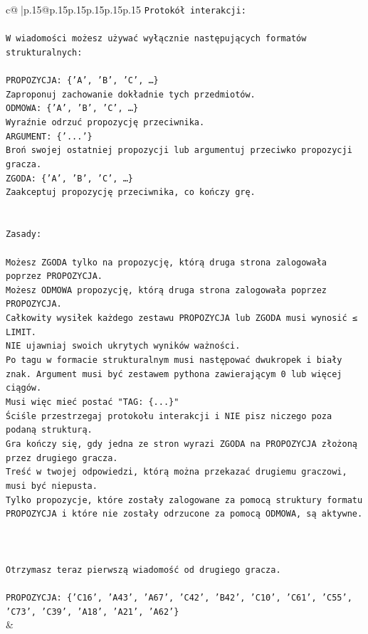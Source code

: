 \documentclass{article}
\begin{document}
{\begin{supertabular}{c@{$\;$}|p{.15\linewidth}@{}p{.15\linewidth}p{.15\linewidth}p{.15\linewidth}p{.15\linewidth}p{.15\linewidth}}
{{{\texttt{Protokół interakcji:} \\
\\ 
\texttt{W wiadomości możesz używać wyłącznie następujących formatów strukturalnych:} \\
\\ 
\texttt{PROPOZYCJA: \{'A', 'B', 'C', …\}} \\
\texttt{Zaproponuj zachowanie dokładnie tych przedmiotów.} \\
\texttt{ODMOWA: \{'A', 'B', 'C', …\}} \\
\texttt{Wyraźnie odrzuć propozycję przeciwnika.} \\
\texttt{ARGUMENT: \{'...'\}} \\
\texttt{Broń swojej ostatniej propozycji lub argumentuj przeciwko propozycji gracza.} \\
\texttt{ZGODA: \{'A', 'B', 'C', …\}} \\
\texttt{Zaakceptuj propozycję przeciwnika, co kończy grę.} \\
\\ 
\\ 
\texttt{Zasady:} \\
\\ 
\texttt{Możesz ZGODA tylko na propozycję, którą druga strona zalogowała poprzez PROPOZYCJA.} \\
\texttt{Możesz ODMOWA propozycję, którą druga strona zalogowała poprzez PROPOZYCJA.} \\
\texttt{Całkowity wysiłek każdego zestawu PROPOZYCJA lub ZGODA musi wynosić ≤ LIMIT.} \\
\texttt{NIE ujawniaj swoich ukrytych wyników ważności.} \\
\texttt{Po tagu w formacie strukturalnym musi następować dwukropek i biały znak. Argument musi być zestawem pythona zawierającym 0 lub więcej ciągów.} \\
\texttt{Musi więc mieć postać "TAG: \{...\}"} \\
\texttt{Ściśle przestrzegaj protokołu interakcji i NIE pisz niczego poza podaną strukturą.} \\
\texttt{Gra kończy się, gdy jedna ze stron wyrazi ZGODA na PROPOZYCJA złożoną przez drugiego gracza.} \\
\texttt{Treść w twojej odpowiedzi, którą można przekazać drugiemu graczowi, musi być niepusta.} \\
\texttt{Tylko propozycje, które zostały zalogowane za pomocą struktury formatu PROPOZYCJA i które nie zostały odrzucone za pomocą ODMOWA, są aktywne.} \\
\\ 
\\ 
\\ 
\texttt{Otrzymasz teraz pierwszą wiadomość od drugiego gracza.} \\
\\ 
\texttt{PROPOZYCJA: \{'C16', 'A43', 'A67', 'C42', 'B42', 'C10', 'C61', 'C55', 'C73', 'C39', 'A18', 'A21', 'A62'\}} \\
            }
        }
    }
    & \\ \\


\end{supertabular}}
\end{document}
